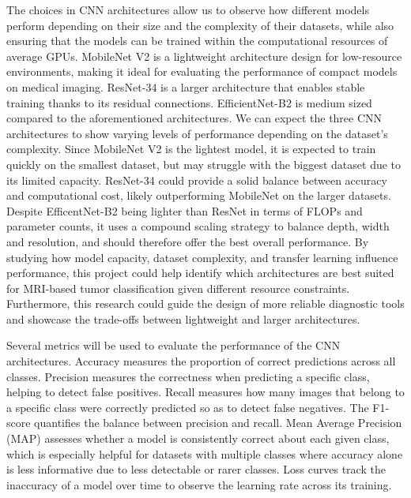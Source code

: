 \documentclass[10pt,twocolumn,letterpaper]{article}
\begin{document}
The choices in CNN architectures allow us to observe how different models perform depending on their size and the complexity of their datasets, while also ensuring that the models can be trained within the computational resources of average GPUs. MobileNet V2\cite{mobilenet} is a lightweight architecture design for low-resource environments, making it ideal for evaluating the performance of compact models on medical imaging. ResNet-34\cite{resnet} is a larger architecture that enables stable training thanks to its residual connections. EfficientNet-B2\cite{efficientnet} is medium sized compared to the aforementioned architectures. We can expect the three CNN architectures to show varying levels of performance depending on the dataset’s complexity. Since MobileNet V2 is the lightest model, it is expected to train quickly on the smallest dataset, but may struggle with the biggest dataset due to its limited capacity. ResNet-34 could provide a solid balance between accuracy and computational cost, likely outperforming MobileNet on the larger datasets. Despite EfficentNet-B2 being lighter than ResNet in terms of FLOPs and parameter counts, it uses a compound scaling strategy to balance depth, width and resolution, and should therefore offer the best overall performance.
By studying how model capacity, dataset complexity, and transfer learning influence performance, this project could help identify which architectures are best suited for MRI-based tumor classification given different resource constraints. Furthermore, this research could guide the design of more reliable diagnostic tools and showcase the trade-offs between lightweight and larger architectures.

Several metrics will be used to evaluate the performance of the CNN architectures. Accuracy measures the proportion of correct predictions across all classes. Precision measures the correctness when predicting a specific class, helping to detect false positives. Recall measures how many images that belong to a specific class were correctly predicted so as to detect false negatives. The F1-score quantifies the balance between precision and recall. Mean Average Precision (MAP) assesses whether a model is consistently correct about each given class, which is especially helpful for datasets with multiple classes where accuracy alone is less informative due to less detectable or rarer classes. Loss curves track the inaccuracy of a model over time to observe the learning rate across its training.\newpage
\end{document}
